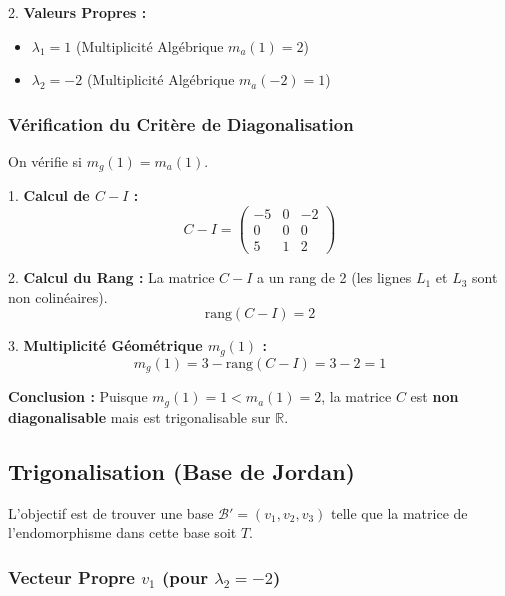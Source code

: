\documentclass[french]{yLectureNote}
\begin{document}
2.  \textbf{Valeurs Propres :}
    \begin{itemize}
        \item $\lambda_1 = 1$ (Multiplicité Algébrique $m_a(1) = 2$)
        \item $\lambda_2 = -2$ (Multiplicité Algébrique $m_a(-2) = 1$)
    \end{itemize}

\subsubsection{Vérification du Critère de Diagonalisation}

On vérifie si $m_g(1) = m_a(1)$.

1.  \textbf{Calcul de $C - I$ :}
    $$C - I = \begin{pmatrix} -5 & 0 & -2 \\ 0 & 0 & 0 \\ 5 & 1 & 2 \end{pmatrix}$$

2.  \textbf{Calcul du Rang :}
    La matrice $C - I$ a un rang de 2 (les lignes $L_1$ et $L_3$ sont non colinéaires).
    $$\text{rang}(C - I) = 2$$

3.  \textbf{Multiplicité Géométrique $m_g(1)$ :}
    $$m_g(1) = 3 - \text{rang}(C - I) = 3 - 2 = 1$$

\textbf{Conclusion :} Puisque $m_g(1) = 1 < m_a(1) = 2$, la matrice $C$ est \textbf{non diagonalisable} mais est trigonalisable sur $\mathbb{R}$.

\subsection{Trigonalisation (Base de Jordan)}

L'objectif est de trouver une base $\mathcal{B}' = (v_1, v_2, v_3)$ telle que la matrice de l'endomorphisme dans cette base soit $T$.

\subsubsection{Vecteur Propre $v_1$ (pour $\lambda_2 = -2$)}
\end{document}
